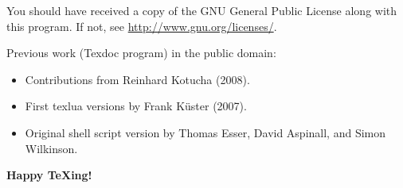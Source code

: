 \documentclass{texdoc-doc}
\begin{document}
You should have received a copy of the GNU General Public License along with
this program. If not, see \url{http://www.gnu.org/licenses/}.

\bigskip

Previous work (Texdoc program) in the public domain:
%
\begin{itemize}
\item Contributions from Reinhard Kotucha (2008).
\item First texlua versions by Frank K\"uster (2007).
\item Original shell script version by Thomas Esser, David Aspinall, and Simon
  Wilkinson.
\end{itemize}

\bigskip

\begin{center}
\Large\bfseries
Happy {\TeX}ing!
\end{center}
\end{document}
